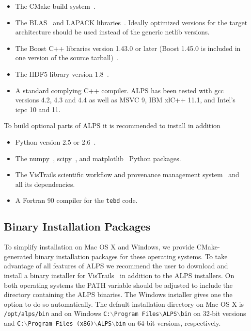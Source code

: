 \documentclass[12pt]{iopart}
\begin{document}
\begin{itemize}
\item The CMake build system~\cite{cmake}.
\item The BLAS~\cite{blasnetlib} and LAPACK libraries~\cite{lapack}. Ideally optimized versions for the target architecture should be used instead of the generic netlib versions.
\item The Boost C++ libraries version 1.43.0 or later (Boost 1.45.0 is included in one version of the source tarball)~\cite{boost}.
\item The HDF5 library version 1.8~\cite{hdf5}.
\item A standard complying C++ compiler. ALPS has been tested with gcc versions 4.2, 4.3 and 4.4 as well as MSVC 9, IBM xlC++ 11.1, and Intel's icpc 10 and 11.
\end{itemize}
To build optional parts of ALPS it is recommended to install in addition
\begin{itemize}
\item Python version 2.5 or 2.6~\cite{python}.
\item The numpy~\cite{numpy}, scipy~\cite{scipy}, and matplotlib~\cite{matplotlib} Python packages.
\item The VisTrails scientific workflow and provenance management system~\cite{vistrails} and all its dependencies.
\item A Fortran 90 compiler for the {\tt tebd} code.
\end{itemize}

\subsection{Binary Installation Packages}

To simplify installation on Mac OS X and Windows, we provide CMake-generated binary installation packages for these operating systems. To take advantage of all features of ALPS we recommend the user to download and install a binary installer for VisTrails~\cite{vistrails} in addition to the ALPS installers. On both operating systems the PATH variable should be adjusted to include the directory containing the ALPS binaries. The Windows installer gives one the option to do so automatically. The default installation directory on Mac OS X is {\tt /opt/alps/bin} and on Windows {\tt C:$\backslash$Program Files$\backslash$ALPS$\backslash$bin} on 32-bit versions and {\tt C:$\backslash$Program Files (x86)$\backslash$ALPS$\backslash$bin} on 64-bit versions, respectively.
\end{document}
